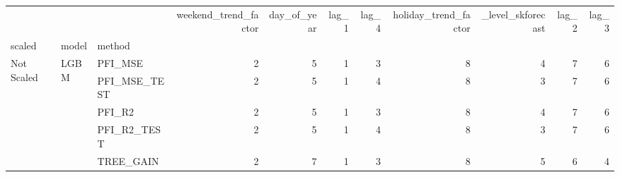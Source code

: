 \begin{table}
\centering
\begin{tabular}{lllrrrrrrrr}
\toprule
 &  &  & weekend\_trend\_factor & day\_of\_year & lag\_1 & lag\_4 & holiday\_trend\_factor & \_level\_skforecast & lag\_2 & lag\_3 \\
scaled & model & method &  &  &  &  &  &  &  &  \\
\midrule
\multirow[c]{18}{*}{Not Scaled} & \multirow[c]{9}{*}{LGBM} & PFI\_MSE & {\cellcolor[HTML]{6788EE}} \color[HTML]{F1F1F1} 2 & {\cellcolor[HTML]{EDD1C2}} \color[HTML]{000000} 5 & {\cellcolor[HTML]{3B4CC0}} \color[HTML]{F1F1F1} 1 & {\cellcolor[HTML]{9ABBFF}} \color[HTML]{000000} 3 & {\cellcolor[HTML]{B40426}} \color[HTML]{F1F1F1} 8 & {\cellcolor[HTML]{C9D7F0}} \color[HTML]{000000} 4 & {\cellcolor[HTML]{E26952}} \color[HTML]{F1F1F1} 7 & {\cellcolor[HTML]{F7A889}} \color[HTML]{000000} 6 \\
 &  & PFI\_MSE\_TEST & {\cellcolor[HTML]{6788EE}} \color[HTML]{F1F1F1} 2 & {\cellcolor[HTML]{EDD1C2}} \color[HTML]{000000} 5 & {\cellcolor[HTML]{3B4CC0}} \color[HTML]{F1F1F1} 1 & {\cellcolor[HTML]{C9D7F0}} \color[HTML]{000000} 4 & {\cellcolor[HTML]{B40426}} \color[HTML]{F1F1F1} 8 & {\cellcolor[HTML]{9ABBFF}} \color[HTML]{000000} 3 & {\cellcolor[HTML]{E26952}} \color[HTML]{F1F1F1} 7 & {\cellcolor[HTML]{F7A889}} \color[HTML]{000000} 6 \\
 &  & PFI\_R2 & {\cellcolor[HTML]{6788EE}} \color[HTML]{F1F1F1} 2 & {\cellcolor[HTML]{EDD1C2}} \color[HTML]{000000} 5 & {\cellcolor[HTML]{3B4CC0}} \color[HTML]{F1F1F1} 1 & {\cellcolor[HTML]{9ABBFF}} \color[HTML]{000000} 3 & {\cellcolor[HTML]{B40426}} \color[HTML]{F1F1F1} 8 & {\cellcolor[HTML]{C9D7F0}} \color[HTML]{000000} 4 & {\cellcolor[HTML]{E26952}} \color[HTML]{F1F1F1} 7 & {\cellcolor[HTML]{F7A889}} \color[HTML]{000000} 6 \\
 &  & PFI\_R2\_TEST & {\cellcolor[HTML]{6788EE}} \color[HTML]{F1F1F1} 2 & {\cellcolor[HTML]{EDD1C2}} \color[HTML]{000000} 5 & {\cellcolor[HTML]{3B4CC0}} \color[HTML]{F1F1F1} 1 & {\cellcolor[HTML]{C9D7F0}} \color[HTML]{000000} 4 & {\cellcolor[HTML]{B40426}} \color[HTML]{F1F1F1} 8 & {\cellcolor[HTML]{9ABBFF}} \color[HTML]{000000} 3 & {\cellcolor[HTML]{E26952}} \color[HTML]{F1F1F1} 7 & {\cellcolor[HTML]{F7A889}} \color[HTML]{000000} 6 \\
 &  & TREE\_GAIN & {\cellcolor[HTML]{6788EE}} \color[HTML]{F1F1F1} 2 & {\cellcolor[HTML]{E26952}} \color[HTML]{F1F1F1} 7 & {\cellcolor[HTML]{3B4CC0}} \color[HTML]{F1F1F1} 1 & {\cellcolor[HTML]{9ABBFF}} \color[HTML]{000000} 3 & {\cellcolor[HTML]{B40426}} \color[HTML]{F1F1F1} 8 & {\cellcolor[HTML]{EDD1C2}} \color[HTML]{000000} 5 & {\cellcolor[HTML]{F7A889}} \color[HTML]{000000} 6 & {\cellcolor[HTML]{C9D7F0}} \color[HTML]{000000} 4 \\

\end{tabular}
\end{table}
